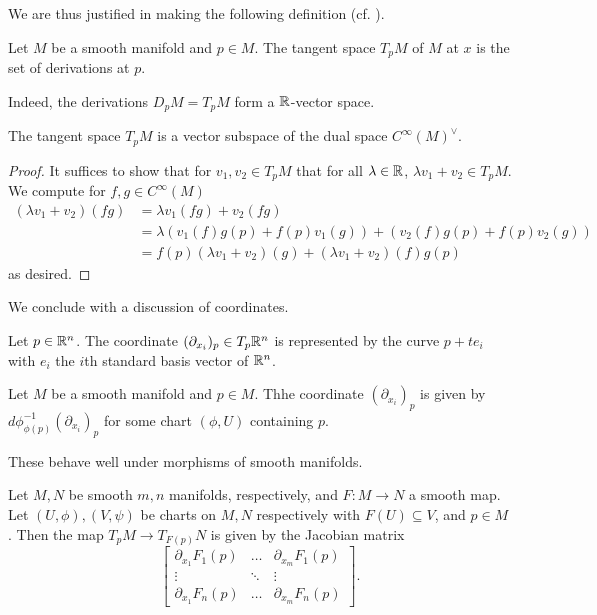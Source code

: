 We are thus justified in making the following definition (cf. ). 
\begin{definition}\label{def: tangent space derivations}
    Let $M$ be a smooth manifold and $p\in M$. The tangent space $T_{p}M$ of $M$ at $x$ is the set of derivations at $p$. 
\end{definition}
Indeed, the derivations $D_{p}M=T_{p}M$ form a $\mathbb{R}$-vector space. 
\begin{proposition}\label{prop: derivations are a vector space}
    The tangent space $T_{p}M$ is a vector subspace of the dual space $C^{\infty}(M)^{\vee}$. 
\end{proposition}
\begin{proof}
    It suffices to show that for $v_{1},v_{2}\in T_{p}M$ that for all $\lambda\in\mathbb{R}$, $\lambda v_{1}+v_{2}\in T_{p}M$. We compute for $f,g\in C^{\infty}(M)$
    \begin{align*}
        (\lambda v_{1}+v_{2})(fg) &= \lambda v_{1}(fg) + v_{2}(fg) \\
        &= \lambda\left(v_{1}(f)g(p)+f(p)v_{1}(g)\right)+\left(v_{2}(f)g(p)+f(p)v_{2}(g)\right) \\
        &= f(p)\left(\lambda v_{1}+v_{2}\right)(g)+\left(\lambda v_{1}+v_{2}\right)(f)g(p)
    \end{align*}
    as desired. 
\end{proof}
We conclude with a discussion of coordinates. 
\begin{definition}\label{def: Rn coordinates}
    Let $p\in\mathbb{R}^{n}$. The coordinate $(\partial_{x_{i}})_{p}\in T_{p}\mathbb{R}^{n}$ is represented by the curve $p+te_{i}$ with $e_{i}$ the $i$th standard basis vector of $\mathbb{R}^{n}$. 
\end{definition}
\begin{definition}\label{def: coordinates on smooth manifold}
    Let $M$ be a smooth manifold and $p\in M$. Thhe coordinate $(\partial_{x_{i}})_{p}$ is given by $d\phi^{-1}_{\phi(p)}(\partial_{x_{i}})_{p}$ for some chart $(\phi,U)$ containing $p$.
\end{definition}
These behave well under morphisms of smooth manifolds. 
\begin{proposition}\label{prop: map on tangent spaces is Jacobian}
    Let $M,N$ be smooth $m,n$ manifolds, respectively, and $F:M\to N$ a smooth map. Let $(U,\phi),(V,\psi)$ be charts on $M,N$ respectively with $F(U)\subseteq V$, and $p\in M$. Then the map $T_{p}M\to T_{F(p)}N$ is given by the Jacobian matrix 
    $$\begin{bmatrix}
        \partial_{x_{1}}F_{1}(p) & \dots & \partial_{x_{m}}F_{1}(p) \\
        \vdots & \ddots & \vdots \\
        \partial_{x_{1}} F_{n}(p) & \dots & \partial_{x_{m}}F_{n}(p)
    \end{bmatrix}.$$
\end{proposition}
